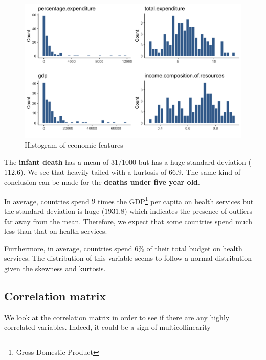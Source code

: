 \begin{figure}[H]
	\centering
	\includegraphics{figures/histogram_economic_features.png}
	\caption{Histogram of economic features}
	\label{fig:histogram_economic_features}
\end{figure}

The \textbf{infant death} has a mean of $31 / 1000$ but has a huge standard deviation ($112.6$). We see that heavily tailed with a kurtosis of $66.9$. The same kind of conclusion can be made for the \textbf{deaths under five year old}.

In average, countries spend $9$ times the GDP\footnote{Gross Domestic Product} per capita on health services but the standard deviation is huge ($1931.8$) which indicates the presence of outliers far away from the mean. Therefore, we expect that some countries spend much less than that on health services.

Furthermore, in average, countries spend $6 \%$ of their total budget on health services. The distribution of this variable seems to follow a normal distribution given the skewness and kurtosis.

\subsection{Correlation matrix}

We look at the correlation matrix in order to see if there are any highly correlated variables. Indeed, it could be a sign of multicollinearity

